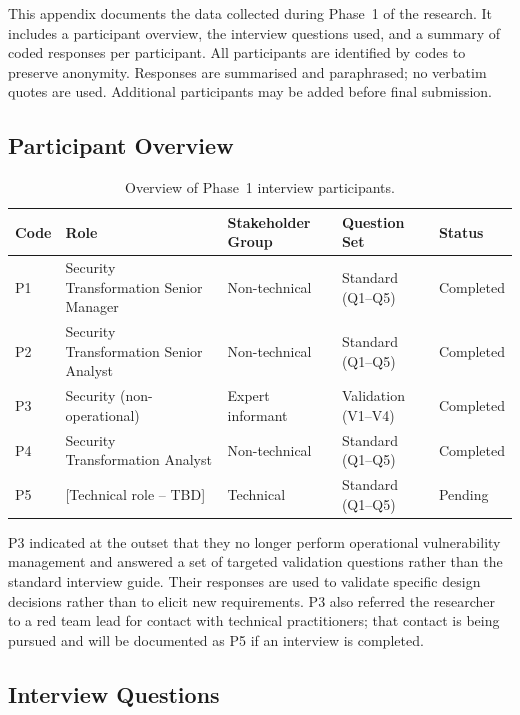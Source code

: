 This appendix documents the data collected during Phase~1 of the research. It includes a participant overview, the interview questions used, and a summary of coded responses per participant. All participants are identified by codes to preserve anonymity. Responses are summarised and paraphrased; no verbatim quotes are used. Additional participants may be added before final submission.

\subsection*{Participant Overview}

\begin{table}[h]
\centering
\begin{tabular}{@{}lllll@{}}
\toprule
\textbf{Code} & \textbf{Role} & \textbf{Stakeholder Group} & \textbf{Question Set} & \textbf{Status} \\
\midrule
P1 & Security Transformation Senior Manager  & Non-technical & Standard (Q1--Q5) & Completed \\
P2 & Security Transformation Senior Analyst  & Non-technical & Standard (Q1--Q5) & Completed \\
P3 & Security (non-operational)              & Expert informant & Validation (V1--V4) & Completed \\
P4 & Security Transformation Analyst         & Non-technical & Standard (Q1--Q5) & Completed \\
P5 & [Technical role -- TBD]                 & Technical     & Standard (Q1--Q5) & Pending \\
\bottomrule
\end{tabular}
\caption{Overview of Phase~1 interview participants.}
\label{tab:participants}
\end{table}

P3 indicated at the outset that they no longer perform operational vulnerability management and answered a set of targeted validation questions rather than the standard interview guide. Their responses are used to validate specific design decisions rather than to elicit new requirements. P3 also referred the researcher to a red team lead for contact with technical practitioners; that contact is being pursued and will be documented as P5 if an interview is completed.

\subsection*{Interview Questions}

